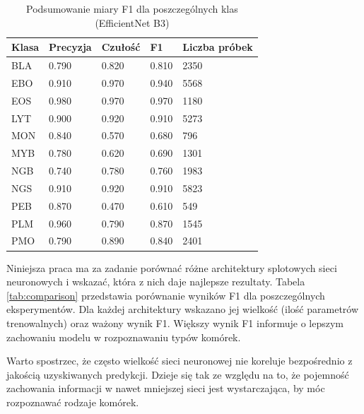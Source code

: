 \begin{table}
    \begin{center}
        \begin{tabular}{|l|l|l|l|l|}
            \hline
            Klasa & Precyzja & Czułość & F1    & Liczba próbek \\
            \hline
            BLA   & 0.790    & 0.820   & 0.810 & 2350          \\
            \hline
            EBO   & 0.910    & 0.970   & 0.940 & 5568          \\
            \hline
            EOS   & 0.980    & 0.970   & 0.970 & 1180          \\
            \hline
            LYT   & 0.900    & 0.920   & 0.910 & 5273          \\
            \hline
            MON   & 0.840    & 0.570   & 0.680 & 796           \\
            \hline
            MYB   & 0.780    & 0.620   & 0.690 & 1301          \\
            \hline
            NGB   & 0.740    & 0.780   & 0.760 & 1983          \\
            \hline
            NGS   & 0.910    & 0.920   & 0.910 & 5823          \\
            \hline
            PEB   & 0.870    & 0.470   & 0.610 & 549           \\
            \hline
            PLM   & 0.960    & 0.790   & 0.870 & 1545          \\
            \hline
            PMO   & 0.790    & 0.890   & 0.840 & 2401          \\
            \hline
        \end{tabular}
    \end{center}
    \caption{Podsumowanie miary F1 dla poszczególnych klas (EfficientNet B3)}
    \label{tab:f1_summary}
\end{table}

Niniejsza praca ma za zadanie porównać różne architektury splotowych sieci neuronowych i wskazać, która z nich daje najlepsze rezultaty.
Tabela \ref{tab:comparison} przedstawia porównanie wyników F1 dla poszczególnych eksperymentów.
Dla każdej architektury wskazano jej wielkość (ilość parametrów trenowalnych) oraz ważony wynik F1.
Większy wynik F1 informuje o lepszym zachowaniu modelu w rozpoznawaniu typów komórek.

Warto spostrzec, że często wielkość sieci neuronowej nie koreluje bezpośrednio z jakością uzyskiwanych predykcji.
Dzieje się tak ze względu na to, że pojemność zachowania informacji w nawet mniejszej sieci jest wystarczająca, by móc rozpoznawać rodzaje komórek.

